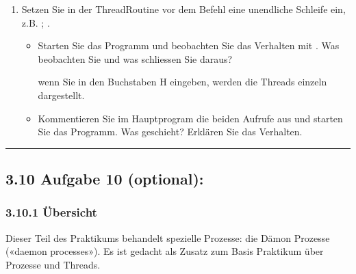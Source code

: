 \documentclass[a4paper,10pt,english]{report}
\begin{document}
\begin{sphinxVerbatim}[commandchars=\\\{\}]

\end{sphinxVerbatim}
\begin{enumerate}
%
\item {} 
\sphinxAtStartPar
Setzen Sie in der Thread\sphinxhyphen{}Routine vor dem Befehl  eine unendliche Schleife ein, z.B. ; .
\begin{itemize}
\item {} 
\sphinxAtStartPar
Starten Sie das Programm und beobachten Sie das Verhalten mit . Was beobachten Sie und was schliessen Sie daraus?

\sphinxAtStartPar
{} wenn Sie in  den Buchstaben H eingeben, werden die Threads einzeln dargestellt.

\item {} 
\sphinxAtStartPar
Kommentieren Sie im Hauptprogram die beiden  Aufrufe aus und starten Sie das Programm. Was geschieht? Erklären Sie das Verhalten.

\end{itemize}

\end{enumerate}

\begin{sphinxVerbatim}[commandchars=\\\{\}]

\end{sphinxVerbatim}


\bigskip\hrule\bigskip



\subsection{3.10 Aufgabe 10 (optional):}
\label{\detokenize{P07_Prozesse_und_Threads/README:aufgabe-10-optional}}

\subsubsection{3.10.1 Übersicht}
\label{\detokenize{P07_Prozesse_und_Threads/README:id1}}
\sphinxAtStartPar
Dieser Teil des Praktikums behandelt spezielle Prozesse: die Dämon Prozesse («daemon pro\sphinxhyphen{}cesses»). Es ist gedacht als Zusatz zum Basis Praktikum über Prozesse und Threads.
\end{document}
